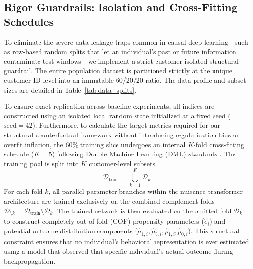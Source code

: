 \documentclass[10pt, conference]{IEEEtran}
\begin{document}
\subsection{Rigor Guardrails: Isolation and Cross-Fitting Schedules}
To eliminate the severe data leakage traps common in causal deep learning—such as row-based random splits that let an individual's past or future information contaminate test windows—we implement a strict customer-isolated structural guardrail. The entire population dataset is partitioned strictly at the unique customer ID level into an immutable 60/20/20 ratio. The data profile and subset sizes are detailed in Table~\ref{tab:data_splits}.

\begin{table}[h]
\centering
{}
\caption{Data Split and Population Isolation Profile Under Global Reproducibility Seeding ($\text{Seed}=42$).}
\label{tab:data_splits}
\end{table}

To ensure exact replication across baseline experiments, all indices are constructed using an isolated local random state initialized at a fixed seed ($\text{seed} = 42$). Furthermore, to calculate the target metrics required for our structural counterfactual framework without introducing regularization bias or overfit inflation, the 60\% training slice undergoes an internal $K$-fold cross-fitting schedule ($K=5$) following Double Machine Learning (DML) standards \cite{Chernozhukov2018}. The training pool is split into $K$ customer-level subsets:
\begin{equation}
\mathcal{D}_{\text{train}} = \bigcup_{k=1}^K \mathcal{D}_k
\end{equation}
For each fold $k$, all parallel parameter branches within the nuisance transformer architecture are trained exclusively on the combined complement folds $\mathcal{D}_{\setminus k} = \mathcal{D}_{\text{train}} \setminus \mathcal{D}_k$. The trained network is then evaluated on the omitted fold $\mathcal{D}_k$ to construct completely out-of-fold (OOF) propensity parameters ($\hat{e}_i$) and potential outcome distribution components ($\hat{\mu}_{1,i}, \hat{\mu}_{0,i}, \hat{p}_{1,i}, \hat{p}_{0,i}$). This structural constraint ensures that no individual's behavioral representation is ever estimated using a model that observed that specific individual's actual outcome during backpropagation.
\end{document}
